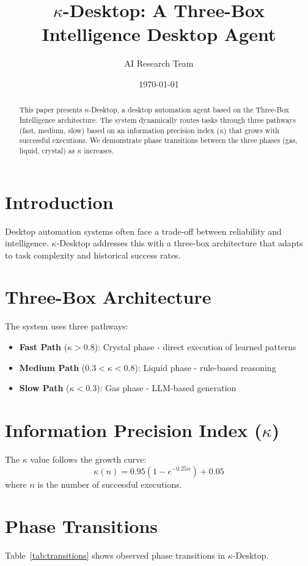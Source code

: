 \documentclass{article}
\title{$\kappa$-Desktop: A Three-Box Intelligence Desktop Agent}
\author{AI Research Team}
\date{\today}
\begin{document}
\maketitle

\begin{abstract}
This paper presents $\kappa$-Desktop, a desktop automation agent based on the Three-Box Intelligence architecture. The system dynamically routes tasks through three pathways (fast, medium, slow) based on an information precision index ($\kappa$) that grows with successful executions. We demonstrate phase transitions between the three phases (gas, liquid, crystal) as $\kappa$ increases.
\end{abstract}

\section{Introduction}
Desktop automation systems often face a trade-off between reliability and intelligence. $\kappa$-Desktop addresses this with a three-box architecture that adapts to task complexity and historical success rates.

\section{Three-Box Architecture}
The system uses three pathways:
\begin{itemize}
    \item \textbf{Fast Path} ($\kappa > 0.8$): Crystal phase - direct execution of learned patterns
    \item \textbf{Medium Path} ($0.3 < \kappa < 0.8$): Liquid phase - rule-based reasoning
    \item \textbf{Slow Path} ($\kappa < 0.3$): Gas phase - LLM-based generation
\end{itemize}

\section{Information Precision Index ($\kappa$)}
The $\kappa$ value follows the growth curve:
\[
\kappa(n) = 0.95(1 - e^{-0.25n}) + 0.05
\]
where $n$ is the number of successful executions.

\section{Phase Transitions}
Table~\ref{tab:transitions} shows observed phase transitions in $\kappa$-Desktop.
\end{document}
